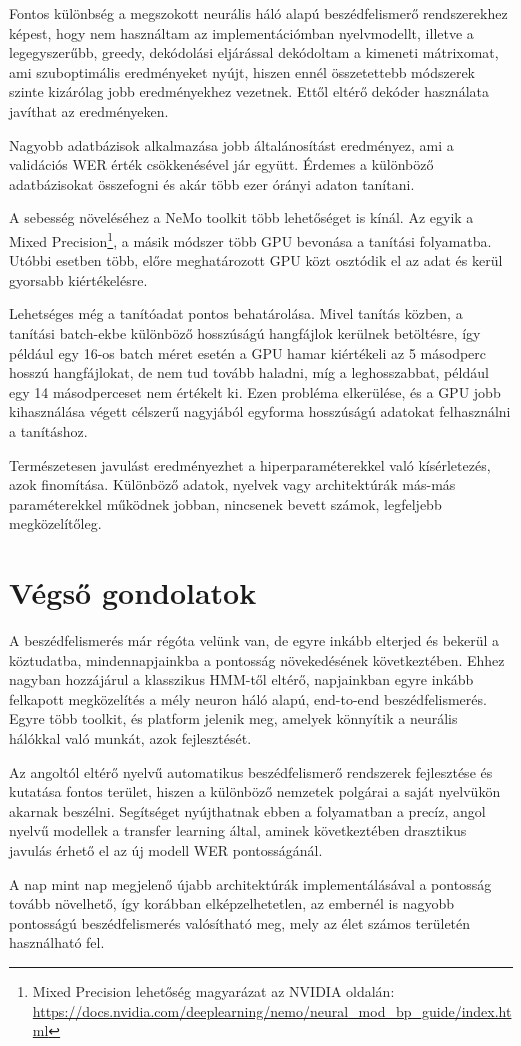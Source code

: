 Fontos különbség a megszokott neurális háló alapú beszédfelismerő rendszerekhez képest, hogy nem használtam az implementációmban nyelvmodellt, illetve a legegyszerűbb, greedy, dekódolási eljárással dekódoltam a kimeneti mátrixomat, ami szuboptimális eredményeket nyújt, hiszen ennél összetettebb módszerek szinte kizárólag jobb eredményekhez vezetnek\cite{decoder}. Ettől eltérő dekóder használata javíthat az eredményeken.

Nagyobb adatbázisok alkalmazása jobb általánosítást eredményez, ami a validációs WER érték csökkenésével jár együtt. Érdemes a különböző adatbázisokat összefogni és akár több ezer órányi adaton tanítani.

A sebesség növeléséhez a NeMo toolkit több lehetőséget is kínál. Az egyik a Mixed Precision\footnote{Mixed Precision lehetőség magyarázat az NVIDIA oldalán: \url{https://docs.nvidia.com/deeplearning/nemo/neural_mod_bp_guide/index.html}}, a másik módszer több GPU bevonása a tanítási folyamatba. Utóbbi esetben több, előre meghatározott GPU közt osztódik el az adat és kerül gyorsabb kiértékelésre.

Lehetséges még a tanítóadat pontos behatárolása. Mivel tanítás közben, a tanítási batch-ekbe különböző hosszúságú hangfájlok kerülnek betöltésre, így például egy 16-os batch méret esetén a GPU hamar kiértékeli az 5 másodperc hosszú hangfájlokat, de nem tud tovább haladni, míg a leghosszabbat, például egy 14 másodperceset nem értékelt ki. Ezen probléma elkerülése, és a GPU jobb kihasználása végett célszerű nagyjából egyforma hosszúságú adatokat felhasználni a tanításhoz.

Természetesen javulást eredményezhet a hiperparaméterekkel való kísérletezés, azok finomítása. Különböző adatok, nyelvek vagy architektúrák más-más paraméterekkel működnek jobban, nincsenek bevett számok, legfeljebb megközelítőleg.

\section{Végső gondolatok}

A beszédfelismerés már régóta velünk van, de egyre inkább elterjed és bekerül a köztudatba, mindennapjainkba a pontosság növekedésének következtében. Ehhez nagyban hozzájárul a klasszikus HMM-től eltérő, napjainkban egyre inkább felkapott megközelítés a mély neuron háló alapú, end-to-end beszédfelismerés. Egyre több toolkit, és platform jelenik meg, amelyek könnyítik a neurális hálókkal való munkát, azok fejlesztését.

Az angoltól eltérő nyelvű automatikus beszédfelismerő rendszerek fejlesztése és kutatása fontos terület, hiszen a különböző nemzetek polgárai a saját nyelvükön akarnak beszélni. Segítséget nyújthatnak ebben a folyamatban a precíz, angol nyelvű modellek a transfer learning által, aminek következtében drasztikus javulás érhető el az új modell WER pontosságánál.

A nap mint nap megjelenő újabb architektúrák implementálásával a pontosság tovább növelhető, így korábban elképzelhetetlen, az embernél is nagyobb pontosságú beszédfelismerés valósítható meg, mely az élet számos területén használható fel.